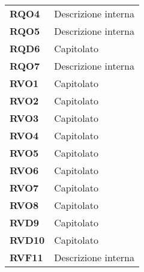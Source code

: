 \begin{longtable}[H]{| >{\centering\bfseries}m{8cm} | >{\centering\arraybackslash}m{8cm} |}
    RQO4
    & Descrizione interna \\

    RQO5
    & Descrizione interna \\

    RQD6
    & Capitolato \\

    RQO7
    & Descrizione interna \\

    RVO1
    & Capitolato \\

    RVO2
    & Capitolato \\

    RVO3
    & Capitolato \\

    RVO4
    & Capitolato \\

    RVO5
    & Capitolato \\

    RVO6
    & Capitolato \\

    RVO7
    & Capitolato \\

    RVO8
    & Capitolato \\

    RVD9
    & Capitolato \\

    RVD10
    & Capitolato \\

    RVF11
    & Descrizione interna \\

\end{longtable}